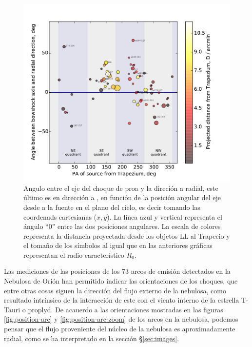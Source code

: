 \begin{figure}
  \centering
  \includegraphics[width=\linewidth, clip]{luis-programas/will-PA-vs-PA}
  \caption{Angulo entre el eje del choque de proa y la direción a radial, este último es en dirección a \thC{}, en función de la posición angular del eje desde \thC{} a la fuente en el plano del cielo, es decir tomando las coordenads cartesianas (\(x, y\)). La línea azul y vertical representa el ángulo ``0'' entre las dos posiciones angulares. La escala de colores representa la distancia proyectada desde los objetos LL al Trapecio y el tomaño de los símbolos al igual que en las anteriores gráficas representan el radio característico \(R_{0}\).}
 \label{fig:pos-angular}
\end{figure}

Las mediciones de las posiciones de los 73 arcos de emisión detectados en la Nebulosa de Orión han permitido indicar las orientaciones de los choques, que entre otras cosas siguen la dirección del flujo externo de la nebulosa, como resultado intrínsico de la interacción de este con el viento interno de la estrella T-Tauri o proplyd. De acauerdo a las orientaciones mostradas en las  figuras \ref{fig:position-arc} y \ref{fig:position-arc-zoom} de los arcos en la nebulosa, podemos pensar que el flujo proveniente del núcleo de la nebulosa es aproximadamente radial, como se ha interpretado en la sección \S\ref{sec:images}.\\

